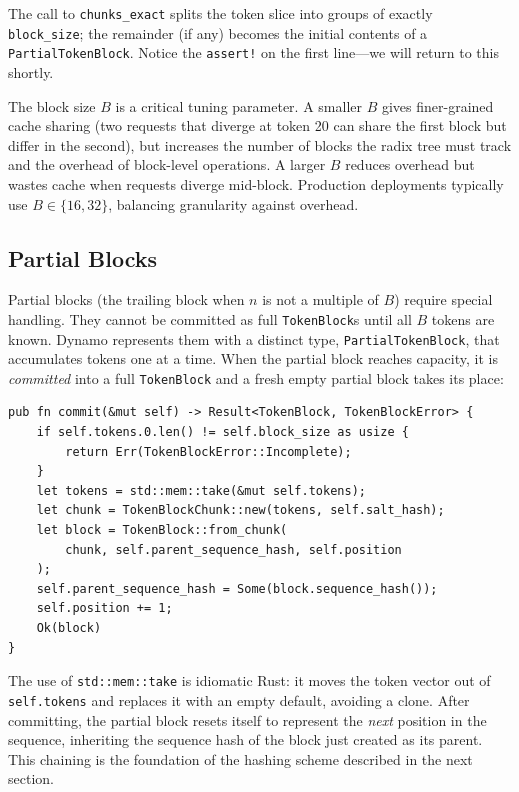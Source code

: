 The call to \texttt{chunks\_exact} splits the token slice into groups of exactly \texttt{block\_size}; the remainder (if any) becomes the initial contents of a \texttt{PartialTokenBlock}. Notice the \texttt{assert!} on the first line---we will return to this shortly.

The block size $B$ is a critical tuning parameter. A smaller $B$ gives finer-grained cache sharing (two requests that diverge at token 20 can share the first block but differ in the second), but increases the number of blocks the radix tree must track and the overhead of block-level operations. A larger $B$ reduces overhead but wastes cache when requests diverge mid-block. Production deployments typically use $B \in \{16, 32\}$, balancing granularity against overhead.

\subsection{Partial Blocks}

Partial blocks (the trailing block when $n$ is not a multiple of $B$) require special handling. They cannot be committed as full \texttt{TokenBlock}s until all $B$ tokens are known. Dynamo represents them with a distinct type, \texttt{PartialTokenBlock}, that accumulates tokens one at a time. When the partial block reaches capacity, it is \emph{committed} into a full \texttt{TokenBlock} and a fresh empty partial block takes its place:

\begin{verbatim}
pub fn commit(&mut self) -> Result<TokenBlock, TokenBlockError> {
    if self.tokens.0.len() != self.block_size as usize {
        return Err(TokenBlockError::Incomplete);
    }
    let tokens = std::mem::take(&mut self.tokens);
    let chunk = TokenBlockChunk::new(tokens, self.salt_hash);
    let block = TokenBlock::from_chunk(
        chunk, self.parent_sequence_hash, self.position
    );
    self.parent_sequence_hash = Some(block.sequence_hash());
    self.position += 1;
    Ok(block)
}
\end{verbatim}

The use of \texttt{std::mem::take} is idiomatic Rust: it moves the token vector out of \texttt{self.tokens} and replaces it with an empty default, avoiding a clone. After committing, the partial block resets itself to represent the \emph{next} position in the sequence, inheriting the sequence hash of the block just created as its parent. This chaining is the foundation of the hashing scheme described in the next section.


